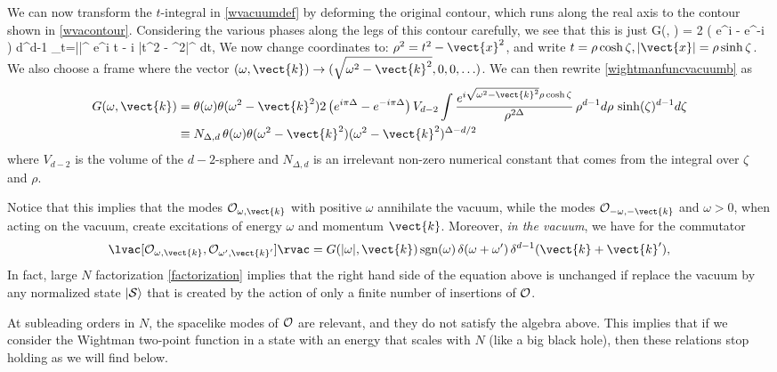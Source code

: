 We can now transform the $t$-integral in \eqref{wvacuumdef} by deforming the original contour, which runs along the real axis to the contour shown in \ref{wvacontour}. Considering the various phases along the legs of this contour carefully, we see that this is just
\be
\label{wightmanfuncvacuumb}
G(\omega,  ) = 2 \left( e^{i \pi \Delta} - e^{-i \pi \Delta} \right) \int d^{d-1}  \int_{t=||}^{\infty} {e^{i \omega t - i  \cdot {}} \over |t^2 - ^2|^{\Delta}} dt,
\ee
We now change coordinates to: $\rho^2 = t^2 - \vect{x}^2$, and write $t = \rho \cosh \zeta, |\vect{x}| = \rho \sinh \zeta$. We also choose a frame where
the vector $(\omega, \vect{k}) \rightarrow (\sqrt{\omega^2 - \vect{k}^2}, 0, 0, \ldots)$. We can then rewrite \eqref{wightmanfuncvacuumb} as
\[
\begin{split}
G(\omega, \vect{k}) &= \theta(\omega) \theta(\omega^2 - \vect{k}^2) 2 \left( e^{i \pi \Delta} - e^{-i \pi \Delta} \right) {V_{d-2}} \int {e^{i \sqrt{\omega^2 - \vect{k}^2} \rho \cosh{\zeta}} \over \rho^{2 \Delta}} \, \rho^{d-1} d\rho \, \sinh(\zeta)^{d-1} d \zeta \\ 
&\equiv N_{\Delta,d} \,\theta(\omega) \theta(\omega^2 - \vect{k}^2) (\omega^2 - \vect{k}^2) ^{\Delta - d/2}
\end{split}
 \]
where $V_{d-2}$ is the volume of the $d-2$-sphere and $N_{\Delta,d}$
is an irrelevant non-zero numerical constant that comes from the
integral over $\zeta$ and $\rho$. 

Notice that this implies that the modes ${\cal O}_{\omega,\vect{k}}$ with positive $\omega$ annihilate the vacuum, while the modes ${\cal O}_{-\omega,-\vect{k}}$ and $\omega>0$, when acting on the vacuum, create excitations of energy $\omega$ and momentum $\vect{k}$. Moreover, {\em in the vacuum}, we have for the commutator
\[
\lvac[{\cal O}_{\omega, \vect{k}}, {\cal O}_{\omega', \vect{k}'}]
\rvac = 
G(|\omega|, \vect{k})\, \text{sgn}(\omega) \,\delta(\omega+\omega') \,\delta^{d-1}(\vect{k} + \vect{k}'),
 \]
In fact, large $N$ factorization \eqref{factorization} implies that the right hand side of the equation above is unchanged if replace the vacuum  by any normalized state $|{\cal S} \rangle$  that is created by the action of only a finite number of insertions of ${\cal O}$.

At subleading orders in $N$, the spacelike modes of ${\cal O}$ are relevant, and they do not satisfy the algebra above.  This implies that if we consider the Wightman two-point function in a state with an energy that scales with $N$ (like a big black hole), then these relations stop holding as we will find below.





